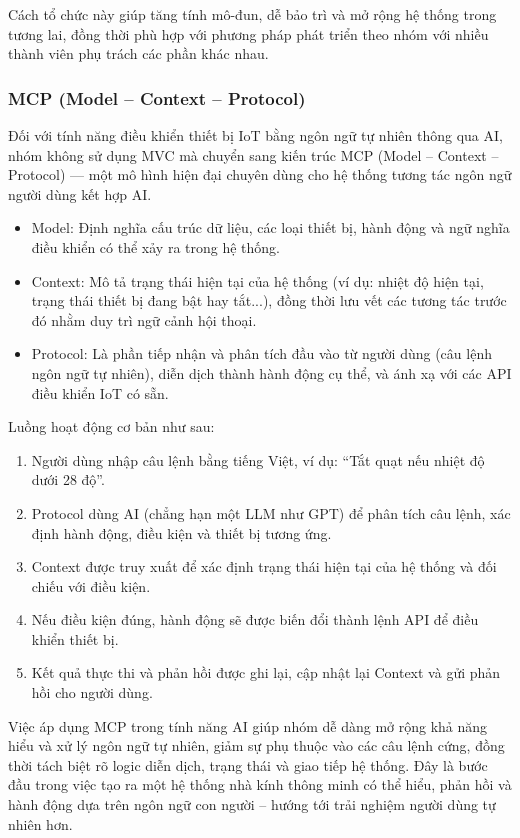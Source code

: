 Cách tổ chức này giúp tăng tính mô-đun, dễ bảo trì và mở rộng hệ thống trong tương lai, đồng thời phù hợp với phương pháp phát triển theo nhóm với nhiều thành viên phụ trách các phần khác nhau.

\subsubsection{MCP (Model – Context – Protocol)}

Đối với tính năng điều khiển thiết bị IoT bằng ngôn ngữ tự nhiên thông qua AI, nhóm không sử dụng MVC mà chuyển sang kiến trúc MCP (Model – Context – Protocol) — một mô hình hiện đại chuyên dùng cho hệ thống tương tác ngôn ngữ người dùng kết hợp AI.
\begin{itemize}
    \item Model: Định nghĩa cấu trúc dữ liệu, các loại thiết bị, hành động và ngữ nghĩa điều khiển có thể xảy ra trong hệ thống.
    \item Context: Mô tả trạng thái hiện tại của hệ thống (ví dụ: nhiệt độ hiện tại, trạng thái thiết bị đang bật hay tắt...), đồng thời lưu vết các tương tác trước đó nhằm duy trì ngữ cảnh hội thoại.
    \item Protocol: Là phần tiếp nhận và phân tích đầu vào từ người dùng (câu lệnh ngôn ngữ tự nhiên), diễn dịch thành hành động cụ thể, và ánh xạ với các API điều khiển IoT có sẵn.
\end{itemize}

Luồng hoạt động cơ bản như sau:
\begin{enumerate}
    \item Người dùng nhập câu lệnh bằng tiếng Việt, ví dụ: “Tắt quạt nếu nhiệt độ dưới 28 độ”.
    \item Protocol dùng AI (chẳng hạn một LLM như GPT) để phân tích câu lệnh, xác định hành động, điều kiện và thiết bị tương ứng.
    \item Context được truy xuất để xác định trạng thái hiện tại của hệ thống và đối chiếu với điều kiện.
    \item Nếu điều kiện đúng, hành động sẽ được biến đổi thành lệnh API để điều khiển thiết bị.
    \item Kết quả thực thi và phản hồi được ghi lại, cập nhật lại Context và gửi phản hồi cho người dùng.
\end{enumerate}

Việc áp dụng MCP trong tính năng AI giúp nhóm dễ dàng mở rộng khả năng hiểu và xử lý ngôn ngữ tự nhiên, giảm sự phụ thuộc vào các câu lệnh cứng, đồng thời tách biệt rõ logic diễn dịch, trạng thái và giao tiếp hệ thống. Đây là bước đầu trong việc tạo ra một hệ thống nhà kính thông minh có thể hiểu, phản hồi và hành động dựa trên ngôn ngữ con người – hướng tới trải nghiệm người dùng tự nhiên hơn.

